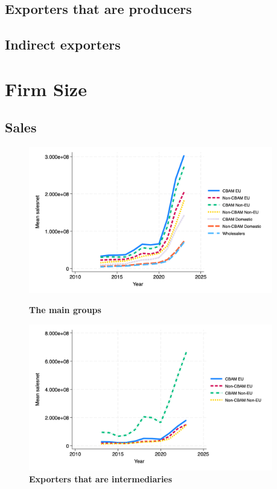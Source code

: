 \documentclass{article}
\begin{document}
\begin{table}[H]
\subsection{Exporters that are producers}


\subsection{Indirect exporters}

\end{table}

\section{Firm Size}

\subsection{Sales}

\begin{figure}[H]
\centering
\includegraphics[width=0.95\textwidth]{salesnet_main_groups.png}
\caption{\textbf{The main groups}}
\includegraphics[width=0.95\textwidth]{salesnet_ei.png}
\caption{\textbf{Exporters that are intermediaries}}
\end{figure}
\end{document}
